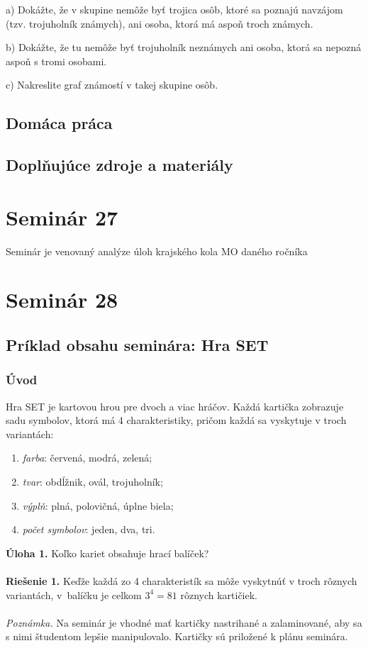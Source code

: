 \documentclass[11pt,a4paper,oneside,final]{book}
\begin{document}
a) Dokážte, že v skupine nemôže byť trojica osôb, ktoré sa poznajú navzájom (tzv. trojuholník známych), ani osoba, ktorá má aspoň troch známych.

b) Dokážte, že tu nemôže byť trojuholník neznámych ani osoba, ktorá sa nepozná aspoň s tromi osobami.

c) Nakreslite graf známostí v takej skupine osôb.

\subsection*{Domáca práca}

\subsection*{Doplňujúce zdroje a materiály}

\newpage
\section*{Seminár 27}
Seminár je venovaný analýze úloh krajského kola MO daného ročníka

\newpage
\section*{Seminár 28}
\subsection*{Príklad obsahu seminára: Hra SET}

\subsubsection*{Úvod}

Hra SET je kartovou hrou pre dvoch a viac hráčov. Každá kartička zobrazuje sadu symbolov, ktorá má 4 charakteristiky, pričom každá sa vyskytuje v troch variantách:
\begin{enumerate}
\item \textit{farba}: červená, modrá, zelená;
\item  \textit{tvar}: obdĺžnik, ovál, trojuholník;
\item \textit{výplň}: plná, polovičná, úplne biela;
\item \textit{počet symbolov}: jeden, dva, tri.
\end{enumerate}

\textbf{Úloha 1.} Koľko kariet obsahuje hrací balíček?\\
\\
\textbf{Riešenie 1.} Keďže každá zo 4 charakteristík sa môže vyskytnúť v troch rôznych variantách, v~balíčku je celkom $3^4=81$ rôznych kartičiek. \\
\\
\textit{Poznámka.} Na seminár je vhodné mať kartičky nastrihané a zalaminované, aby sa s nimi študentom lepšie manipulovalo. Kartičky sú priložené k plánu seminára.
\end{document}
